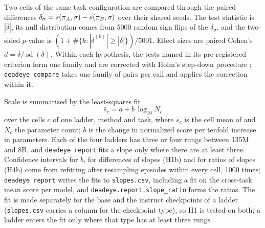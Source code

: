 Two cells of the same task configuration are compared through the paired differences $\delta_\sigma=s(\pi_A,\sigma)-s(\pi_B,\sigma)$ over their shared seeds. The test statistic is $|\bar\delta|$, its null distribution comes from 5000 random sign flips of the $\delta_\sigma$, and the two-sided $p$-value is $(1+\#\{k: |\bar\delta^{(k)}|\ge|\bar\delta|\})/5001$. Effect sizes are paired Cohen's $d=\bar\delta/\operatorname{sd}(\delta)$. Within each hypothesis, the tests named in its pre-registered criterion form one family and are corrected with Holm's step-down procedure \citep{holm1979simple}; \texttt{deadeye compare} takes one family of pairs per call and applies the correction within it.

Scale is summarized by the least-squares fit
\begin{equation}
\label{eq:slope}
\bar{s}_c = a + b\,\log_{10} N_c
\end{equation}
over the cells $c$ of one ladder, method and task, where $\bar s_c$ is the cell mean of \norm{} and $N_c$ the parameter count; $b$ is the change in normalized score per tenfold increase in parameters. Each of the four ladders has three or four rungs between 135M and 8B, and \texttt{deadeye report} fits a slope only where there are at least three. Confidence intervals for $b$, for differences of slopes (H1b) and for ratios of slopes (H4b) come from refitting after resampling episodes within every cell, 1000 times; \texttt{deadeye report} writes the fits to \texttt{slopes.csv}, including a fit on the cross-task mean score per model, and \texttt{deadeye.report.slope\_ratio} forms the ratios. The fit is made separately for the base and the instruct checkpoints of a ladder (\texttt{slopes.csv} carries a column for the checkpoint type), so H1 is tested on both; a ladder enters the fit only where that type has at least three rungs.

